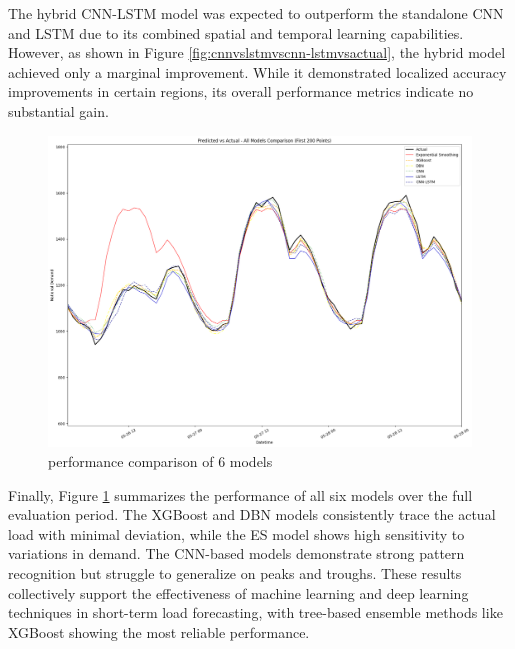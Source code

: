 The hybrid CNN-LSTM model was expected to outperform the standalone CNN and LSTM due to its combined spatial and temporal learning capabilities. However, as shown in Figure \ref{fig:cnnvslstmvscnn-lstmvsactual}, the hybrid model achieved only a marginal improvement. While it demonstrated localized accuracy improvements in certain regions, its overall performance metrics indicate no substantial gain.
\begin{figure}[h]
 	\centering
 	\includegraphics[width=0.8\linewidth]{Chapters/images/results/all_model_comparison}
 	\caption{performance comparison of 6 models}
 	\label{fig:allmodelcomparison}
 \end{figure}

  
  
 Finally, Figure \ref{fig:allmodelcomparison} summarizes the performance of all six models over the full evaluation period. The XGBoost and DBN models consistently trace the actual load with minimal deviation, while the ES model shows high sensitivity to variations in demand. The CNN-based models demonstrate strong pattern recognition but struggle to generalize on peaks and troughs. These results collectively support the effectiveness of machine learning and deep learning techniques in short-term load forecasting, with tree-based ensemble methods like XGBoost showing the most reliable performance.
  
  
 